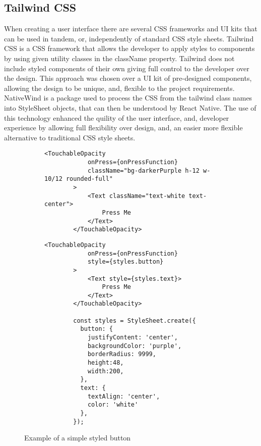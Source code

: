 \subsection{Tailwind CSS}
When creating a user interface there are several CSS frameworks and UI kits that can be used in tandem, or, independently of standard CSS style sheets. Tailwind CSS \cite{tailwind} is a CSS framework that allows the developer to apply styles to components by using given utility classes in the className property. Tailwind does not include styled components of their own giving full control to the developer over the design. This approach was chosen over a UI kit of pre-designed components, allowing the design to be unique, and, flexible to the project requirements. NativeWind \cite{nativewind} is a package used to process the CSS from the tailwind class names into StyleSheet objects, that can then be understood by React Native. The use of this technology enhanced the quility of the user interface, and, developer experience by allowing full flexibility over design, and, an easier more flexible alternative to traditional CSS style sheets. 
\begin{figure}[!htbp]
    \centering
    \begin{subfigure}[b]{0.42\textwidth}
        \begin{lstlisting}[language=jsJsx, caption={Styled using Tailwind CSS}]
        <TouchableOpacity
            onPress={onPressFunction}
            className="bg-darkerPurple h-12 w-10/12 rounded-full"
        >
            <Text className="text-white text-center">
                Press Me
            </Text>
        </TouchableOpacity>
        \end{lstlisting}
    \end{subfigure}
    \hspace{2em}
    \begin{subfigure}[b]{0.45\textwidth}
        \begin{lstlisting}[language=jsJsx, caption={Styled using a traditional StyleSheet}]
        <TouchableOpacity
            onPress={onPressFunction}
            style={styles.button}
        >
            <Text style={styles.text}>
                Press Me
            </Text>
        </TouchableOpacity>
            
        const styles = StyleSheet.create({
          button: {
            justifyContent: 'center',
            backgroundColor: 'purple',
            borderRadius: 9999,
            height:48,
            width:200,
          },
          text: {
            textAlign: 'center',
            color: 'white'
          },
        });
        \end{lstlisting}
    \end{subfigure}
    \caption{Example of a simple styled button}
    \label{fig:tailwind}
\end{figure}
\FloatBarrier
